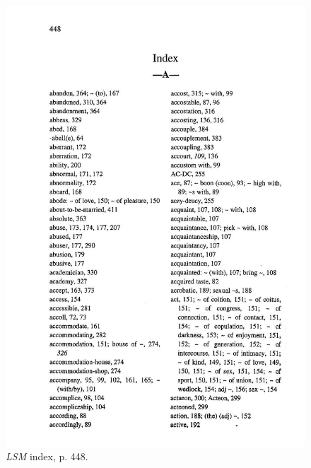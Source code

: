 \begin{figure}[htbp]
  \centering
    \includegraphics[width=\linewidth]{Stolk_thes-content/fig/thes/LSM-p448.jpg}
  \caption{\textit{LSM} index, p. 448.}
  \label{fig:1.A:LSM:index}
\end{figure}



